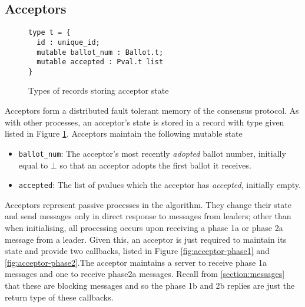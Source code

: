 \subsection{Acceptors}

\begin{figure}
  \begin{lstlisting}
type t = {
  id : unique_id;
  mutable ballot_num : Ballot.t;
  mutable accepted : Pval.t list
}
\end{lstlisting}
  \centering
  \caption{Types of records storing acceptor state}
  \label{fig:acceptor-type}
\end{figure}

Acceptors form a distributed fault tolerant memory of the consensus protocol. As with other processes, an acceptor's state is stored in a record with type given listed in Figure \ref{fig:acceptor-type}. Acceptors maintain the following mutable state

\begin{itemize}
  \item \texttt{ballot\_num}: The acceptor's most recently \emph{adopted} ballot number, initially equal to $\bot$ so that an acceptor adopts the first ballot it receives.
  \item \texttt{accepted}: The list of pvalues which the acceptor has \emph{accepted}, initially empty.
\end{itemize}

Acceptors represent passive processes in the algorithm. They change their state and send messages only in direct response to messages from leaders; other than when initialising, all processing occurs upon receiving a phase 1a or phase 2a message from a leader. Given this, an acceptor is just required to maintain its state and provide two callbacks, listed in Figure \ref{fig:acceptor-phase1} and \ref{fig:acceptor-phase2}.The acceptor maintains a server to receive phase 1a messages and one to receive phase2a messages. Recall from \ref{section:messages} that these are blocking messages and so the phase 1b and 2b replies are just the return type of these callbacks. \\

